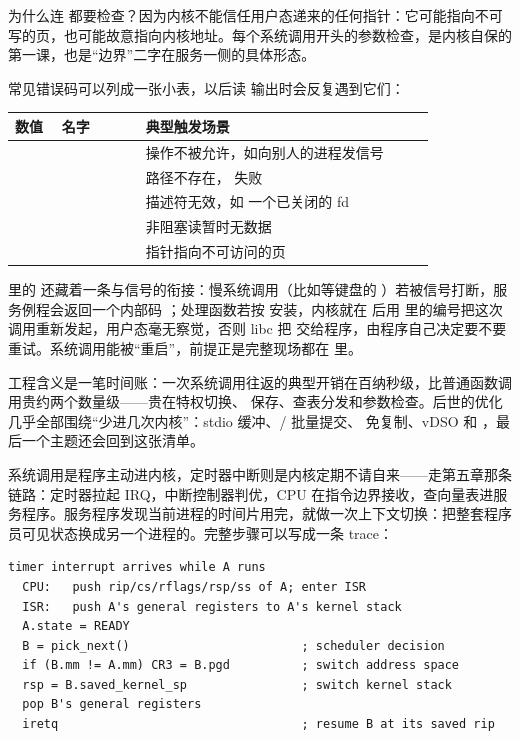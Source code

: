 为什么连  都要检查？因为内核不能信任用户态递来的任何指针：它可能指向不可写的页，也可能故意指向内核地址。每个系统调用开头的参数检查，是内核自保的第一课，也是“边界”二字在服务一侧的具体形态。

常见错误码可以列成一张小表，以后读  输出时会反复遇到它们：

\begin{longtable}{L{0.10\linewidth}L{0.18\linewidth}L{0.62\linewidth}}
\toprule
数值 & 名字 & 典型触发场景 \\
\midrule
{} &  & 操作不被允许，如向别人的进程发信号 \\
 &  & 路径不存在， 失败 \\
 &  & 描述符无效，如  一个已关闭的 fd \\
 &  & 非阻塞读暂时无数据 \\
 &  & 指针指向不可访问的页 \\
\bottomrule
\end{longtable}

 里的  还藏着一条与信号的衔接：慢系统调用（比如等键盘的 ）若被信号打断，服务例程会返回一个内部码 ；处理函数若按  安装，内核就在  后用  里的编号把这次调用重新发起，用户态毫无察觉，否则 libc 把  交给程序，由程序自己决定要不要重试。系统调用能被“重启”，前提正是完整现场都在  里。

工程含义是一笔时间账：一次系统调用往返的典型开销在百纳秒级，比普通函数调用贵约两个数量级——贵在特权切换、 保存、查表分发和参数检查。后世的优化几乎全部围绕“少进几次内核”：stdio 缓冲、/ 批量提交、 免复制、vDSO 和 ，最后一个主题还会回到这张清单。

系统调用是程序主动进内核，定时器中断则是内核定期不请自来——走第五章那条链路：定时器拉起 IRQ，中断控制器判优，CPU 在指令边界接收，查向量表进服务程序。服务程序发现当前进程的时间片用完，就做一次上下文切换：把整套程序员可见状态换成另一个进程的。完整步骤可以写成一条 trace：

\begin{lstlisting}
timer interrupt arrives while A runs
  CPU:   push rip/cs/rflags/rsp/ss of A; enter ISR
  ISR:   push A's general registers to A's kernel stack
  A.state = READY
  B = pick_next()                        ; scheduler decision
  if (B.mm != A.mm) CR3 = B.pgd          ; switch address space
  rsp = B.saved_kernel_sp                ; switch kernel stack
  pop B's general registers
  iretq                                  ; resume B at its saved rip
\end{lstlisting}

